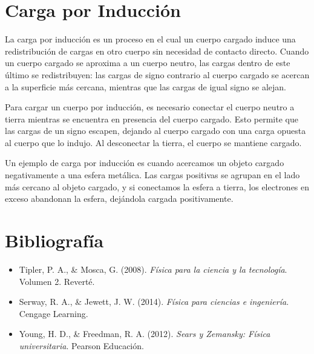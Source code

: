 \documentclass{article}
\begin{document}
\section{Carga por Inducción}
La carga por inducción es un proceso en el cual un cuerpo cargado induce una redistribución de cargas en otro cuerpo sin necesidad de contacto directo. Cuando un cuerpo cargado se aproxima a un cuerpo neutro, las cargas dentro de este último se redistribuyen: las cargas de signo contrario al cuerpo cargado se acercan a la superficie más cercana, mientras que las cargas de igual signo se alejan.

Para cargar un cuerpo por inducción, es necesario conectar el cuerpo neutro a tierra mientras se encuentra en presencia del cuerpo cargado. Esto permite que las cargas de un signo escapen, dejando al cuerpo cargado con una carga opuesta al cuerpo que lo indujo. Al desconectar la tierra, el cuerpo se mantiene cargado.

Un ejemplo de carga por inducción es cuando acercamos un objeto cargado negativamente a una esfera metálica. Las cargas positivas se agrupan en el lado más cercano al objeto cargado, y si conectamos la esfera a tierra, los electrones en exceso abandonan la esfera, dejándola cargada positivamente.

\section*{Bibliografía}
\begin{itemize}
    \item Tipler, P. A., \& Mosca, G. (2008). \textit{Física para la ciencia y la tecnología}. Volumen 2. Reverté.
    \item Serway, R. A., \& Jewett, J. W. (2014). \textit{Física para ciencias e ingeniería}. Cengage Learning.
    \item Young, H. D., \& Freedman, R. A. (2012). \textit{Sears y Zemansky: Física universitaria}. Pearson Educación.
\end{itemize}
\end{document}

